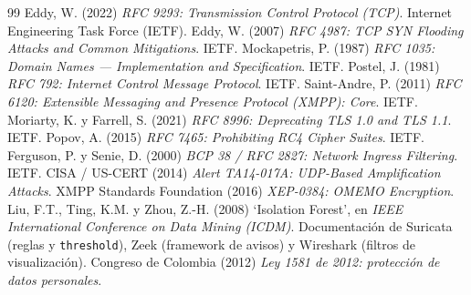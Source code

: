 \begin{thebibliography}{99}
 Eddy, W. (2022) \emph{RFC 9293: Transmission Control Protocol (TCP)}. Internet Engineering Task Force (IETF).
 Eddy, W. (2007) \emph{RFC 4987: TCP SYN Flooding Attacks and Common Mitigations}. IETF.
 Mockapetris, P. (1987) \emph{RFC 1035: Domain Names --- Implementation and Specification}. IETF.
 Postel, J. (1981) \emph{RFC 792: Internet Control Message Protocol}. IETF.
 Saint-Andre, P. (2011) \emph{RFC 6120: Extensible Messaging and Presence Protocol (XMPP): Core}. IETF.
 Moriarty, K. y Farrell, S. (2021) \emph{RFC 8996: Deprecating TLS 1.0 and TLS 1.1}. IETF.
 Popov, A. (2015) \emph{RFC 7465: Prohibiting RC4 Cipher Suites}. IETF.
 Ferguson, P. y Senie, D. (2000) \emph{BCP 38 / RFC 2827: Network Ingress Filtering}. IETF.
 CISA / US-CERT (2014) \emph{Alert TA14-017A: UDP-Based Amplification Attacks}.
 XMPP Standards Foundation (2016) \emph{XEP-0384: OMEMO Encryption}.
 Liu, F.T., Ting, K.M. y Zhou, Z.-H. (2008) `Isolation Forest', en \emph{IEEE International Conference on Data Mining (ICDM)}.
 Documentaci\'on de Suricata (reglas y \texttt{threshold}), Zeek (framework de avisos) y Wireshark (filtros de visualizaci\'on).
 Congreso de Colombia (2012) \emph{Ley 1581 de 2012: protecci\'on de datos personales}.
\end{thebibliography}
